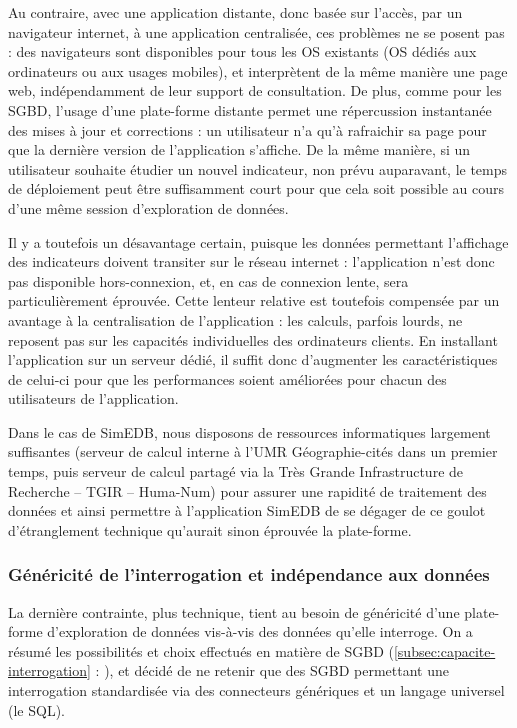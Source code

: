 		Au contraire, avec une application distante, donc basée sur l'accès, par un navigateur internet, à une application centralisée, ces problèmes ne se posent pas : des navigateurs sont disponibles pour tous les OS existants (OS dédiés aux ordinateurs ou aux usages mobiles), et interprètent de la même manière une page web, indépendamment de leur support de consultation.
		De plus, comme pour les SGBD, l'usage d'une plate-forme distante permet une répercussion instantanée des mises à jour et corrections : un utilisateur n'a qu'à rafraichir sa page pour que la dernière version de l'application s'affiche.
		De la même manière, si un utilisateur souhaite étudier un nouvel indicateur, non prévu auparavant, le temps de déploiement peut être suffisamment court pour que cela soit possible au cours d'une même session d'exploration de données.
		
		Il y a toutefois un désavantage certain, puisque les données permettant l'affichage des indicateurs doivent transiter sur le réseau internet : l'application n'est donc pas disponible hors-connexion, et, en cas de connexion lente, sera particulièrement éprouvée.
		Cette lenteur relative est toutefois compensée par un avantage à la centralisation de l'application : les calculs, parfois lourds, ne reposent pas sur les capacités individuelles des ordinateurs clients.
		En installant l'application sur un serveur dédié, il suffit donc d'augmenter les caractéristiques de celui-ci pour que les performances soient améliorées pour chacun des utilisateurs de l'application.
		
		Dans le cas de SimEDB, nous disposons de ressources informatiques largement suffisantes (serveur de calcul interne à l'UMR Géographie-cités dans un premier temps, puis serveur de calcul partagé via la \og Très Grande Infrastructure de Recherche\fg{} -- TGIR -- Huma-Num) pour assurer une rapidité de traitement des données et ainsi permettre à l'application SimEDB de se dégager de ce \og goulot d'étranglement\fg{} technique qu'aurait sinon éprouvée la plate-forme.
			
		\subsubsection{Généricité de l'interrogation et indépendance aux données}
		
		La dernière contrainte, plus technique, tient au besoin de généricité d'une plate-forme d'exploration de données vis-à-vis des données qu'elle interroge.
		On a résumé les possibilités et choix effectués en matière de SGBD (\cref{subsec:capacite-interrogation} :  ), et décidé de ne retenir que des SGBD permettant une interrogation standardisée via des connecteurs génériques et un langage universel (le SQL).
		
